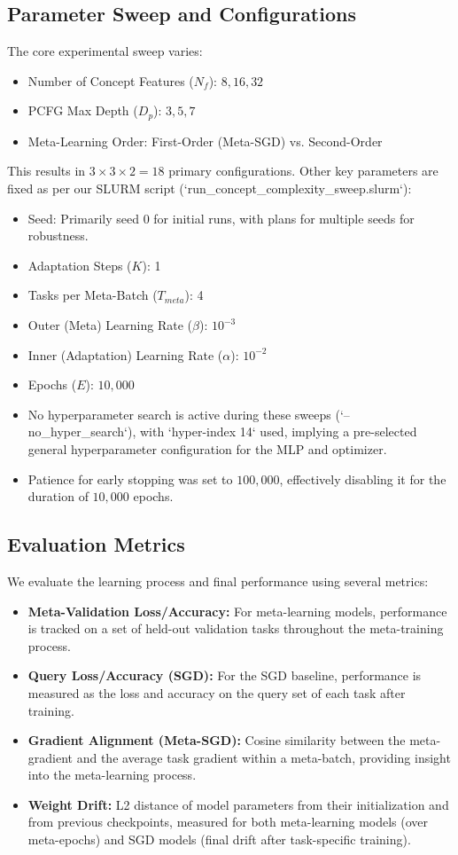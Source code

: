 \documentclass[11pt, a4paper]{article}
\begin{document}
\subsection{Parameter Sweep and Configurations}
The core experimental sweep varies:
\begin{itemize}
    \item Number of Concept Features ($N_f$): ${8, 16, 32}$
    \item PCFG Max Depth ($D_p$): ${3, 5, 7}$
    \item Meta-Learning Order: First-Order (Meta-SGD) vs. Second-Order
\end{itemize}
This results in $3 \times 3 \times 2 = 18$ primary configurations.
Other key parameters are fixed as per our SLURM script (`run_concept_complexity_sweep.slurm`):
\begin{itemize}
    \item Seed: Primarily seed 0 for initial runs, with plans for multiple seeds for robustness.
    \item Adaptation Steps ($K$): 1
    \item Tasks per Meta-Batch ($T_{meta}$): 4
    \item Outer (Meta) Learning Rate ($\beta$): $10^{-3}$
    \item Inner (Adaptation) Learning Rate ($\alpha$): $10^{-2}$
    \item Epochs ($E$): $10,000$
    \item No hyperparameter search is active during these sweeps (`--no_hyper_search`), with `hyper-index 14` used, implying a pre-selected general hyperparameter configuration for the MLP and optimizer.
    \item Patience for early stopping was set to $100,000$, effectively disabling it for the duration of $10,000$ epochs.
\end{itemize}

\subsection{Evaluation Metrics}
We evaluate the learning process and final performance using several metrics:
\begin{itemize}
    \item \textbf{Meta-Validation Loss/Accuracy:} For meta-learning models, performance is tracked on a set of held-out validation tasks throughout the meta-training process.
    \item \textbf{Query Loss/Accuracy (SGD):} For the SGD baseline, performance is measured as the loss and accuracy on the query set of each task after training.
    \item \textbf{Gradient Alignment (Meta-SGD):} Cosine similarity between the meta-gradient and the average task gradient within a meta-batch, providing insight into the meta-learning process.
    \item \textbf{Weight Drift:} L2 distance of model parameters from their initialization and from previous checkpoints, measured for both meta-learning models (over meta-epochs) and SGD models (final drift after task-specific training).
\end{itemize}
\end{document}
